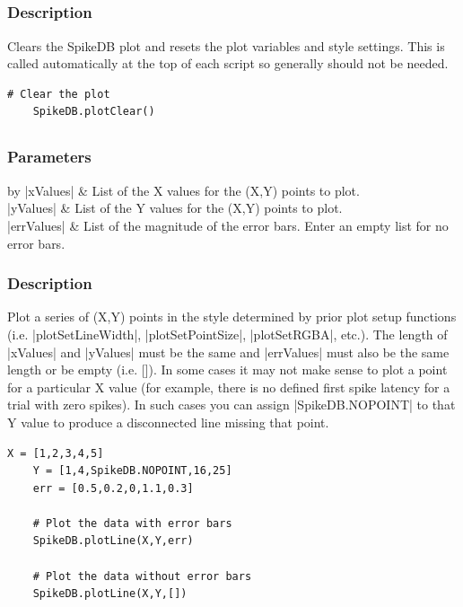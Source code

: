 \documentclass{report}
\begin{document}
\clearpage
\subsection{}
\subsubsection{Description}
Clears the SpikeDB plot and resets the plot variables and style settings. This is called automatically at the top of each script so generally should not be needed.
\begin{lstlisting}[caption=Example]
	# Clear the plot
	SpikeDB.plotClear()
\end{lstlisting}


\clearpage
\subsection[\method{void}{plotLine}]{}
\subsubsection{Parameters}
\begin{table}[h]
\begin{center}
\begin{tabular}{by}
		|xValues| & List of the X values for the (X,Y) points to plot.\\
		|yValues| & List of the Y values for the (X,Y) points to plot.\\
		|errValues| & List of the magnitude of the error bars. Enter an empty list for no error bars.\\
	\end{tabular}
\end{center}
\end{table}
\subsubsection{Description}
Plot a series of (X,Y) points in the style determined by prior plot setup functions (i.e. |plotSetLineWidth|, |plotSetPointSize|, |plotSetRGBA|, etc.). The length of |xValues| and |yValues| must be the same and |errValues| must also be the same length or be empty (i.e. []). In some cases it may not make sense to plot a point for a particular X value (for example, there is no defined first spike latency for a trial with zero spikes).  In such cases you can assign |SpikeDB.NOPOINT| to that Y value to produce a disconnected line missing that point.
\begin{lstlisting}[caption=Example]
	X = [1,2,3,4,5]
	Y = [1,4,SpikeDB.NOPOINT,16,25]
	err = [0.5,0.2,0,1.1,0.3]

	# Plot the data with error bars
	SpikeDB.plotLine(X,Y,err)

	# Plot the data without error bars
	SpikeDB.plotLine(X,Y,[])
\end{lstlisting}
\end{document}
